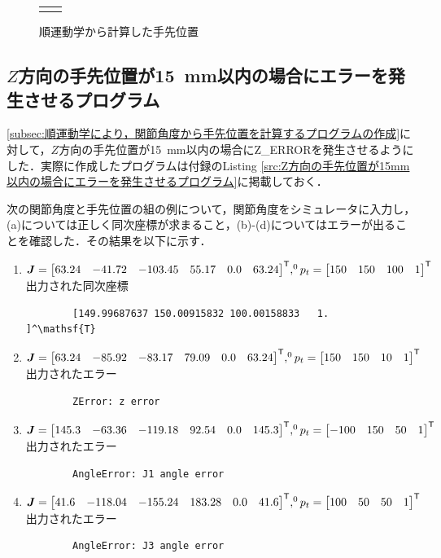 \documentclass{ltjsarticle}
\begin{document}
\begin{figure}[H]
\begin{tabular}{cc}
\begin{minipage}[c]{0.48\linewidth}
			\subcaption{}
		\end{minipage}
		& \\
	\end{tabular}
	\caption{順運動学から計算した手先位置}
	\label{fig:順運動学から計算した手先位置}
\end{figure}

\subsection{$Z$方向の手先位置が\SI{15}{\mm}以内の場合にエラーを発生させるプログラム}\label{subsec:Z方向の手先位置が15mm以内の場合にエラーを発生させるプログラム}
\cref{subsec:順運動学により，関節角度から手先位置を計算するプログラムの作成}に対して，$Z$方向の手先位置が\SI{15}{\mm}以内の場合にZ\_ERRORを発生させるようにした．実際に作成したプログラムは付録のListing \ref{src:Z方向の手先位置が15mm以内の場合にエラーを発生させるプログラム}に掲載しておく．

次の関節角度と手先位置の組の例について，関節角度をシミュレータに入力し，(a)については正しく同次座標が求まること，(b)-(d)についてはエラーが出ることを確認した．その結果を以下に示す．
\begin{enumerate}[label=(\alph*)]
	\item $\bm{J} = \mqty[63.24 & -41.72 & -103.45 & 55.17 & 0.0 & 63.24]^\mathsf{T}, ^0p_t = \mqty[150 & 150 & 100 & 1]^\mathsf{T}$ \\
	出力された同次座標
	\begin{lstlisting}
		[149.99687637 150.00915832 100.00158833   1.        ]^\mathsf{T}
	\end{lstlisting}
	\item $\bm{J} = \mqty[63.24 & -85.92 & -83.17 & 79.09 & 0.0 & 63.24]^\mathsf{T}, ^0p_t = \mqty[150 & 150 & 10 & 1]^\mathsf{T}$ \\
	出力されたエラー
	\begin{lstlisting}
		ZError: z error
	\end{lstlisting}
	\item $\bm{J} = \mqty[145.3 & -63.36 & -119.18 & 92.54 & 0.0 & 145.3]^\mathsf{T}, ^0p_t = \mqty[-100 & 150 & 50 & 1]^\mathsf{T}$ \\
	出力されたエラー
	\begin{lstlisting}
		AngleError: J1 angle error
	\end{lstlisting}
	\item $\bm{J} = \mqty[41.6 & -118.04 & -155.24 & 183.28 & 0.0 & 41.6]^\mathsf{T}, ^0p_t = \mqty[100 & 50 & 50 & 1]^\mathsf{T}$ \\
	出力されたエラー
	\begin{lstlisting}
		AngleError: J3 angle error
	\end{lstlisting}
\end{enumerate}
\end{document}
